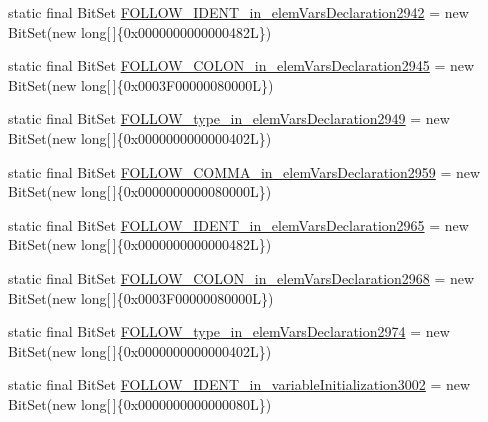 \begin{DoxyCompactItemize}
static final Bit\-Set \hyperlink{classorg_1_1tzi_1_1use_1_1parser_1_1shell_1_1_shell_command_parser_afd3932050584fd61d52f5a0f697c3b45}{F\-O\-L\-L\-O\-W\-\_\-\-I\-D\-E\-N\-T\-\_\-in\-\_\-elem\-Vars\-Declaration2942} = new Bit\-Set(new long\mbox{[}$\,$\mbox{]}\{0x0000000000000482\-L\})
\item 
static final Bit\-Set \hyperlink{classorg_1_1tzi_1_1use_1_1parser_1_1shell_1_1_shell_command_parser_aac17e5eb42b0d125c6e3ddad2becad5f}{F\-O\-L\-L\-O\-W\-\_\-\-C\-O\-L\-O\-N\-\_\-in\-\_\-elem\-Vars\-Declaration2945} = new Bit\-Set(new long\mbox{[}$\,$\mbox{]}\{0x0003\-F00000080000\-L\})
\item 
static final Bit\-Set \hyperlink{classorg_1_1tzi_1_1use_1_1parser_1_1shell_1_1_shell_command_parser_a71aa789d075cf5d07df04e25957abcdf}{F\-O\-L\-L\-O\-W\-\_\-type\-\_\-in\-\_\-elem\-Vars\-Declaration2949} = new Bit\-Set(new long\mbox{[}$\,$\mbox{]}\{0x0000000000000402\-L\})
\item 
static final Bit\-Set \hyperlink{classorg_1_1tzi_1_1use_1_1parser_1_1shell_1_1_shell_command_parser_a634601c61dbe7db8f260c89792ddae24}{F\-O\-L\-L\-O\-W\-\_\-\-C\-O\-M\-M\-A\-\_\-in\-\_\-elem\-Vars\-Declaration2959} = new Bit\-Set(new long\mbox{[}$\,$\mbox{]}\{0x0000000000080000\-L\})
\item 
static final Bit\-Set \hyperlink{classorg_1_1tzi_1_1use_1_1parser_1_1shell_1_1_shell_command_parser_a37567cbf3ecbf68686af1def6c2b5d19}{F\-O\-L\-L\-O\-W\-\_\-\-I\-D\-E\-N\-T\-\_\-in\-\_\-elem\-Vars\-Declaration2965} = new Bit\-Set(new long\mbox{[}$\,$\mbox{]}\{0x0000000000000482\-L\})
\item 
static final Bit\-Set \hyperlink{classorg_1_1tzi_1_1use_1_1parser_1_1shell_1_1_shell_command_parser_a314b201fa29d51a30cda0a5868b19716}{F\-O\-L\-L\-O\-W\-\_\-\-C\-O\-L\-O\-N\-\_\-in\-\_\-elem\-Vars\-Declaration2968} = new Bit\-Set(new long\mbox{[}$\,$\mbox{]}\{0x0003\-F00000080000\-L\})
\item 
static final Bit\-Set \hyperlink{classorg_1_1tzi_1_1use_1_1parser_1_1shell_1_1_shell_command_parser_ad1125ec919cc21dbbe6b890bac9d56ea}{F\-O\-L\-L\-O\-W\-\_\-type\-\_\-in\-\_\-elem\-Vars\-Declaration2974} = new Bit\-Set(new long\mbox{[}$\,$\mbox{]}\{0x0000000000000402\-L\})
\item 
static final Bit\-Set \hyperlink{classorg_1_1tzi_1_1use_1_1parser_1_1shell_1_1_shell_command_parser_a6ecfe1c6304d3a718dc62df573dfcb3d}{F\-O\-L\-L\-O\-W\-\_\-\-I\-D\-E\-N\-T\-\_\-in\-\_\-variable\-Initialization3002} = new Bit\-Set(new long\mbox{[}$\,$\mbox{]}\{0x0000000000000080\-L\})
\item 

\end{DoxyCompactItemize}
